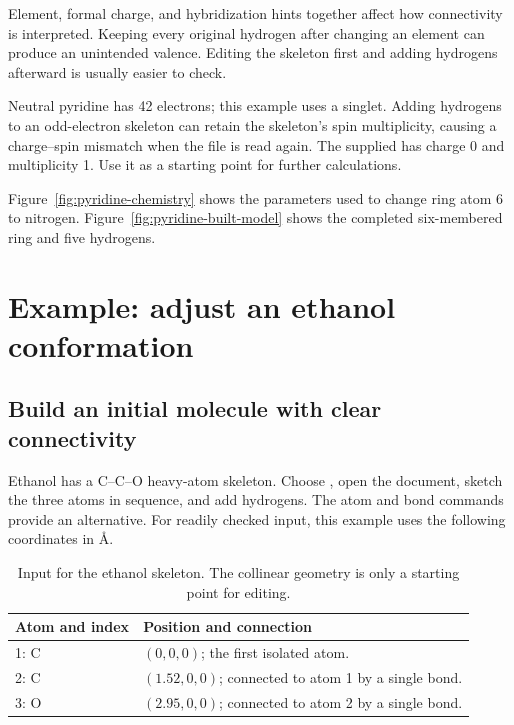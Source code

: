 Element, formal charge, and hybridization hints together affect how connectivity is interpreted. Keeping every original hydrogen after changing an element can produce an unintended valence. Editing the skeleton first and adding hydrogens afterward is usually easier to check.

Neutral pyridine has 42 electrons; this example uses a singlet. Adding hydrogens to an odd-electron skeleton can retain the skeleton's spin multiplicity, causing a charge--spin mismatch when the file is read again. The supplied  has charge 0 and multiplicity 1. Use it as a starting point for further calculations.

Figure~\ref{fig:pyridine-chemistry} shows the parameters used to change ring atom 6 to nitrogen. Figure~\ref{fig:pyridine-built-model} shows the completed six-membered ring and five hydrogens.



\section{Example: adjust an ethanol conformation}

\subsection{Build an initial molecule with clear connectivity}

Ethanol has a C--C--O heavy-atom skeleton. Choose , open the document, sketch the three atoms in sequence, and add hydrogens. The atom and bond commands provide an alternative. For readily checked input, this example uses the following coordinates in \AA.

\begin{table}[htbp]
\centering
\caption{Input for the ethanol skeleton. The collinear geometry is only a starting point for editing.}
\begin{tabularx}{\linewidth}{lX}
\toprule
Atom and index & Position and connection \\
\midrule
1: C & $(0,0,0)$; the first isolated atom.\\
2: C & $(1.52,0,0)$; connected to atom 1 by a single bond.\\
3: O & $(2.95,0,0)$; connected to atom 2 by a single bond.\\
\bottomrule
\end{tabularx}
\end{table}

